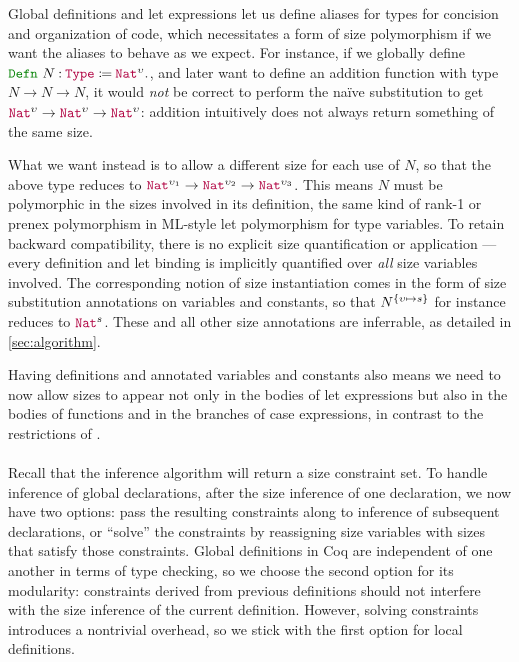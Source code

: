 Global definitions and let expressions let us define aliases for types for concision and organization of code,
which necessitates a form of size polymorphism if we want the aliases to behave as we expect.
For instance, if we globally define $\Defn{N}{\Type{}}{\Nat^\upsilon}$,
and later want to define an addition function with type $N \rightarrow N \rightarrow N$,
it would \emph{not} be correct to perform the na\"ive substitution to get $\Nat^\upsilon \rightarrow \Nat^\upsilon \rightarrow \Nat^\upsilon$:
addition intuitively does not always return something of the same size.

What we want instead is to allow a different size for each use of $N$,
so that the above type reduces to $\Nat^{\upsilon_1} \rightarrow \Nat^{\upsilon_2} \rightarrow \Nat^{\upsilon_3}$.
This means $N$ must be polymorphic in the sizes involved in its definition,
the same kind of rank-1 or prenex polymorphism in ML-style let polymorphism for type variables.
To retain backward compatibility, there is no explicit size quantification or application ---
every definition and let binding is implicitly quantified over \emph{all} size variables involved.
The corresponding notion of size instantiation comes in the form of size substitution annotations on variables and constants, so that $N^{\{\upsilon \mapsto s\}}$ for instance reduces to $\Nat^s$.
These and all other size annotations are inferrable, as detailed in \autoref{sec:algorithm}.

Having definitions and annotated variables and constants also means we need to now allow sizes to appear
not only in the bodies of let expressions but also in the bodies of functions and in the branches of case expressions,
in contrast to the restrictions of \CIChatminus.

\paragraph*{} Recall that the inference algorithm will return a size constraint set.
To handle inference of global declarations, after the size inference of one declaration,
we now have two options:
pass the resulting constraints along to inference of subsequent declarations,
or ``solve'' the constraints by reassigning size variables with sizes that satisfy those constraints.
Global definitions in Coq are independent of one another in terms of type checking,
so we choose the second option for its modularity:
constraints derived from previous definitions should not interfere with the size inference of the current definition.
However, solving constraints introduces a nontrivial overhead,
so we stick with the first option for local definitions.

